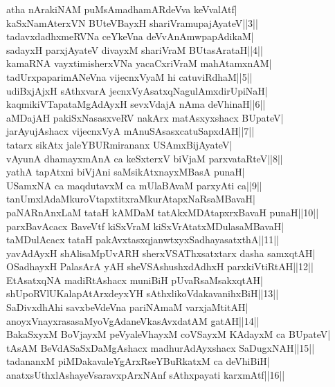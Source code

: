 \documentclass{article}
\begin{document}
atha nArakiNAM puMsAmadhamARdeVva keVvalAtf|\\
kaSxNamAterxVN BUteVBayxH shariVramupajAyateV||3||\\
tadavxdadhxmeRVNa ceYkeVna deVvAnAmwpapAdikaM|\\
sadayxH parxjAyateV divayxM shariVraM BUtasArataH||4||\\
kamaRNA vayxtimisherxVNa yacaCxriVraM mahAtamxnAM|\\
tadUrxpaparimANeVna vijecnxVyaM hi catuviRdhaM||5||\\
udiBxjAjxH sAthxvarA jecnxVyAsatxqNagulAmxdirUpiNaH|\\
kaqmikiVTapataMgAdAyxH sevxVdajA nAma deVhinaH||6||\\
aMDajAH pakiSxNasasxveRV nakArx matAsxyxshacx BUpateV|\\
jarAyujAshacx vijecnxVyA mAnuSAsasxcatuSapxdAH||7||\\
tatarx sikAtx jaleYBURmirananx USAmxBijAyateV|\\
vAyunA dhamayxmAnA ca keSxterxV biVjaM parxvataRteV||8||\\
yathA tapAtxni biVjAni saMsikAtxnayxMBasA punaH|\\
USamxNA ca maqdutavxM ca mUlaBAvaM parxyAti ca||9||\\
tanUmxlAdaMkuroVtapxtitxraMkurAtapxNaRsaMBavaH|\\
paNARnAnxLaM tataH kAMDaM tatAkxMDAtapxrxBavaH punaH||10||\\
parxBavAcacx BaveVtf kiSxVraM kiSxVrAtatxMDulasaMBavaH|\\
taMDulAcacx tataH pakAvxtasxqjanwtxyxSadhayasatxthA||11||\\
yavAdAyxH shAlisaMpUvARH sherxVSAThxsatxtarx dasha samxqtAH|\\
OSadhayxH PalasArA yAH sheVSAshushxdAdhxH parxkiVtiRtAH||12||\\
EtAsatxqNA madiRtAshacx muniBiH pUvaRsaMsakxqtAH|\\
shUpoRVlUKalapAtArxdeyxYH sAthxlikoVdakavanihxBiH||13||\\
SaDivxdhAhi savxbeVdeVna pariNAmaM varxjaMtitAH|\\
anoyxVnayxrasasaMyoVgAdaneVkasAvxdatAM gatAH||14||\\
BakaSxyxM BoVjayxM peVyaleVhayxM coVSayxM KAdayxM ca BUpateV|\\
tAsAM BeVdASaSxDaMgAshacx madhurAdAyxshacx SaDugxNAH||15||\\
tadananxM piMDakavaleYgArxRseYBuRkatxM ca deVhiBiH|\\
anatxsUthxlAshayeVsaravxpArxNAnf sAthxpayati karxmAtf||16||\\
\end{document}
